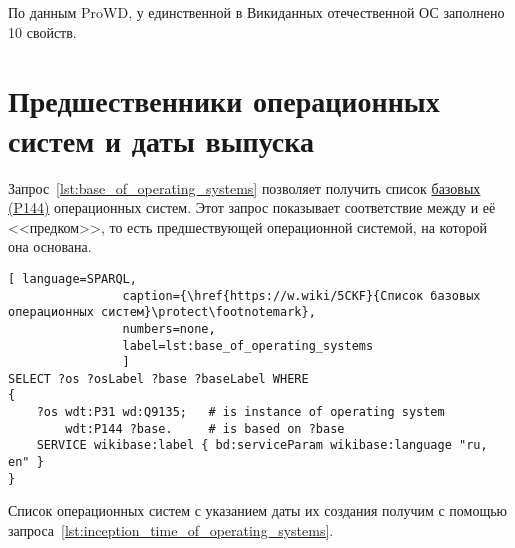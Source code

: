 По данным ProWD, у единственной в Викиданных отечественной ОС 
 заполнено 10 свойств\autocite{prowd_os_link_ru}.




\section{Предшественники операционных систем и даты выпуска}

Запрос~\ref{lst:base_of_operating_systems} позволяет получить 
список \href{https://www.wikidata.org/wiki/Property_talk:P144}{базовых (P144)} операционных систем. 
Этот запрос показывает соответствие 
между  и её <<предком>>, 
то есть предшествующей операционной системой, на которой она основана.


\begin{lstlisting}[ language=SPARQL, 
                caption={\href{https://w.wiki/5CKF}{Список базовых операционных систем}\protect\footnotemark},
                numbers=none,
                label=lst:base_of_operating_systems
                ]
SELECT ?os ?osLabel ?base ?baseLabel WHERE
{
    ?os wdt:P31 wd:Q9135;   # is instance of operating system
        wdt:P144 ?base.     # is based on ?base
    SERVICE wikibase:label { bd:serviceParam wikibase:language "ru, en" }
}
\end{lstlisting}





Список операционных систем с указанием даты их создания 
получим с помощью запроса~\ref{lst:inception_time_of_operating_systems}.
%


